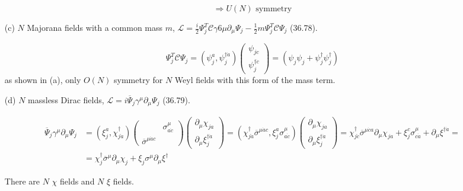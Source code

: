 \documentclass[twoside]{amsart}
\begin{document}
\begin{itemize}
\[
\Longrightarrow \boxed{ U(N) \text{ symmetry}  }
\]


\item[(c)] $N$ Majorana fields with a common mass $m$, $\mathcal{L} = \frac{i}{2} \Psi_j^T \mathcal{C} \gamma6{\mu} \partial_{\mu} \Psi_j - \frac{1}{2} m \Psi_j^T \mathcal{C} \Psi_j$  (36.78).  

\[
\Psi_j^T \mathcal{C} \Psi_j = ( \psi_j^a , \psi_j^{\dag \dot{a}} ) \left( \begin{matrix} \psi_{jc} \\ \psi_j^{\dag \dot{c} } \end{matrix} \right) = ( \psi_j \psi_j + \psi_j^{\dag} \psi_j^{\dag} )
\]
as shown in (a), only $O(N)$ symmetry for $N$ Weyl fields with this form of the mass term.  
\item[(d)] $N$ massless Dirac fields, $\mathcal{L} = i \overline{\Psi}_j \gamma^{\mu} \partial_{\mu} \Psi_j$ (36.79).  

\[
\begin{aligned}
  \overline{\Psi}_j \gamma^{\mu} \partial_{\mu} \Psi_j & = (\xi_j^a, \chi_{j \dot{a}}^{\dag} ) \left( \begin{matrix} & \sigma_{a\dot{c}}^{\mu} \\ \overline{\sigma}^{\mu \dot{a} c} & \end{matrix} \right) \left( \begin{matrix} \partial_{\mu} \chi_{ja} \\ \partial_{\mu} \xi_j^{\dag \dot{a}} \end{matrix} \right) = ( \chi_{j\dot{a}}^{\dag} \overline{\sigma}^{\mu \dot{a} c} , \xi^a_j \sigma^{\mu}_{a\dot{c}} ) \left( \begin{matrix} \partial_{\mu} \chi_{ja} \\ \partial_{\mu} \xi_j^{\dag \dot{a}} \end{matrix} \right) = \chi_{j \dot{c}}^{\dag} \overline{\sigma}^{\mu \dot{c} a} \partial_{\mu} \chi_{ja} + \xi_j^c \sigma_{c\dot{a}}^{\mu} + \partial_{\mu} \xi^{\dag \dot{a}} = \\
  & = \chi_j^{\dag} \overline{\sigma}^{\mu} \partial_{\mu} \chi_j + \xi_j \sigma^{\mu} \partial_{\mu} \xi^{\dag}
\end{aligned}
\]

There are $N$ $\chi$ fields and $N$ $\xi$ fields.  


\end{itemize}
\end{document}
